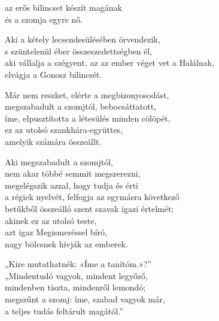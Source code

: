 \begin{dhpverse}

az erős bilincset készít magának\\
és a szomja egyre nő.

 Aki a kétely lecsendesülésében örvendezik,\\
s szüntelenül éber összeszedettségben él,\\
aki vállalja a szégyent, az az ember véget vet a Halálnak,\\
elvágja a Gonosz bilincsét.

 Már nem reszket, elérte a megbizonyosodást,\\
megszabadult a szomjtól, bebocsáttatott,\\
íme, elpusztította a létesülés minden cölöpét,\\
ez az utolsó szankhára-együttes,\\
amelyik számára összeállt.

 Aki megszabadult a szomjtól,\\
nem akar többé semmit megszerezni,\\
megelégszik azzal, hogy tudja és érti\\
a régiek nyelvét, felfogja az egymásra következő\\
betűkből összeálló szent szavak igazi értelmét;\\
akinek ez az utolsó teste,\\
azt igaz Megismeréssel bíró,\\
nagy bölcsnek hívják az emberek.

 „Kire mutathatnék: «Íme a tanítóm.»?”\\
„Mindentudó vagyok, mindent legyőző,\\
mindenben tiszta, mindenről lemondó;\\
megszűnt a szomj: íme, szabad vagyok már,\\
a teljes tudás feltárult magától.”

\end{dhpverse}
\newpage
